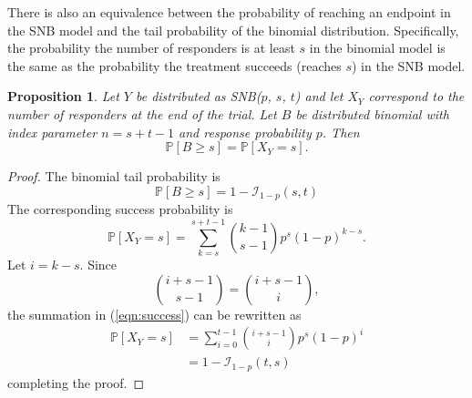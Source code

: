 \documentclass[sii]{ipart}
\newtheorem{prop}{Proposition}
\begin{document}
There is also an equivalence between the probability of reaching an endpoint 
in the SNB model and the tail probability of the binomial distribution.
Specifically, the probability the number of responders is at least 
$s$ in the binomial model is the same as the probability the treatment succeeds 
(reaches $s$) in the SNB model.
\begin{prop} \label{binomial_tail}
Let $Y$ be distributed as SNB($p$, $s$, $t$) and let $X_Y$ correspond
to the number of responders at the end of the trial. Let 
$B$ be distributed binomial with index parameter $n=s+t-1$ and response 
probability $p$. Then
\begin{equation}
\mathbb{P}[B \geq s] = \mathbb{P} [X_Y = s].
\end{equation}
\end{prop}
\begin{proof}
The binomial tail probability is
\begin{equation*}
\mathbb{P}[B \geq s] = 1 - \mathcal{I}_{1-p}(s, t)
\end{equation*}
The corresponding success probability is
\begin{equation} \label{eqn:success}
\mathbb{P} [X_Y = s] 
  = \sum_{k=s}^{s+t-1} {k-1 \choose s-1} p^s (1-p)^{k-s}.
\end{equation}
Let $i=k-s$. Since
\begin{equation*}
{i+s-1 \choose s-1} = {i+s-1 \choose i},
\end{equation*}
the summation in (\ref{eqn:success}) can be rewritten as
\begin{align*}
\mathbb{P} [X_Y = s] &= \sum_{i=0}^{t-1} {i+s-1 \choose i} p^s (1-p)^i\\
  &= 1 - \mathcal{I}_{1-p}(t, s)
\end{align*}
completing the proof.
\end{proof}
\end{document}
